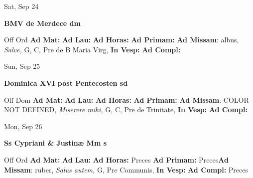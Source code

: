 \documentclass[10pt]{book}
\begin{document}
\begin{center}
\begin{minipage}{3.5in}
\vspace{2em}
\begin{center}Sat, Sep 24
\end{center}
\textbf{ \large BMV de Merdece
\textnormal{\normalsize dm}}

\begin{justify}Off Ord
\textbf{Ad Mat: }
\textbf{Ad Lau: }
\textbf{Ad Horas: }
\textbf{Ad Primam: }\textbf{Ad Missam}: albus, \textit{Salve,} G, C, Pre de B Maria Virg, 
\textbf{In Vesp: }
\textbf{Ad Compl: }
\end{justify}
\end{minipage}
\end{center}

\begin{center}
\begin{minipage}{3.5in}
\vspace{2em}
\begin{center}Sun, Sep 25
\end{center}
\textbf{ \large Dominica XVI post Pentecosten
\textnormal{\normalsize sd}}

\begin{justify}Off Dom
\textbf{Ad Mat: }
\textbf{Ad Lau: }
\textbf{Ad Horas: }
\textbf{Ad Primam: }\textbf{Ad Missam}: COLOR NOT DEFINED, \textit{Miserere mihi,} G, C, Pre de Trinitate, 
\textbf{In Vesp: }
\textbf{Ad Compl: }
\end{justify}
\end{minipage}
\end{center}

\begin{center}
\begin{minipage}{3.5in}
\vspace{2em}
\begin{center}Mon, Sep 26
\end{center}
\textbf{ \large Ss Cypriani \& Justinæ Mm
\textnormal{\normalsize s}}

\begin{justify}Off Ord
\textbf{Ad Mat: }
\textbf{Ad Lau: }
\textbf{Ad Horas: }Preces
\textbf{Ad Primam: }Preces\textbf{Ad Missam}: ruber, \textit{Salus autem,} G, Pre Communis, 
\textbf{In Vesp: }
\textbf{Ad Compl: }Preces
\end{justify}
\end{minipage}
\end{center}
\end{document}

